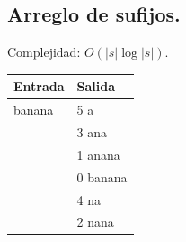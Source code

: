 \documentclass[10pt, letterpaper, twoside]{article}
\begin{document}
\subsection{Arreglo de sufijos.}

Complejidad: $O(|s|\log |s|)$.



\begin{tabular}{|p{7cm}|p{7cm}|}
\hline
\textbf{Entrada} & \textbf{Salida}\\ \hline
banana & 5 a\\
& 3 ana\\
& 1 anana\\
& 0 banana\\
& 4 na\\
& 2 nana\\ \hline
\end{tabular}

\newpage
\end{document}
